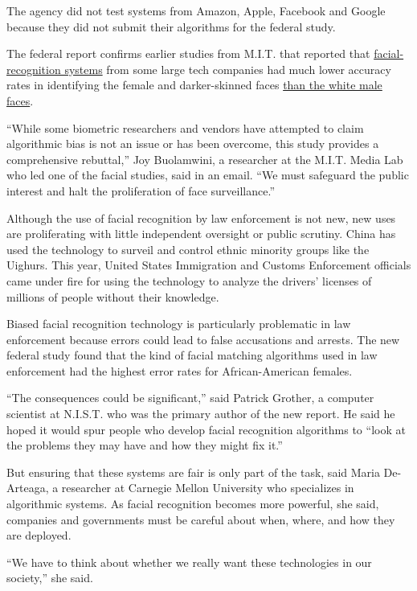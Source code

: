 The agency did not test systems from Amazon, Apple, Facebook and Google
because they did not submit their algorithms for the federal study.

The federal report confirms earlier studies from M.I.T. that reported
that
\href{https://www.nytimes.com/2019/05/15/business/facial-recognition-software-controversy.html}{facial-recognition
systems} from some large tech companies had much lower accuracy rates in
identifying the female and darker-skinned faces
\href{https://www.nytimes.com/2018/02/09/technology/facial-recognition-race-artificial-intelligence.html}{than
the white male faces}.

``While some biometric researchers and vendors have attempted to claim
algorithmic bias is not an issue or has been overcome, this study
provides a comprehensive rebuttal,'' Joy Buolamwini, a researcher at the
M.I.T. Media Lab who led one of the facial studies, said in an email.
``We must safeguard the public interest and halt the proliferation of
face surveillance.''

Although the use of facial recognition by law enforcement is not new,
new uses are proliferating with little independent oversight or public
scrutiny. China has used the technology to surveil and control ethnic
minority groups like the Uighurs. This year, United States Immigration
and Customs Enforcement officials came under fire for using the
technology to analyze the drivers' licenses of millions of people
without their knowledge.

Biased facial recognition technology is particularly problematic in law
enforcement because errors could lead to false accusations and arrests.
The new federal study found that the kind of facial matching algorithms
used in law enforcement had the highest error rates for African-American
females.

``The consequences could be significant,'' said Patrick Grother, a
computer scientist at N.I.S.T. who was the primary author of the new
report. He said he hoped it would spur people who develop facial
recognition algorithms to ``look at the problems they may have and how
they might fix it.''

But ensuring that these systems are fair is only part of the task, said
Maria De-Arteaga, a researcher at Carnegie Mellon University who
specializes in algorithmic systems. As facial recognition becomes more
powerful, she said, companies and governments must be careful about
when, where, and how they are deployed.

``We have to think about whether we really want these technologies in
our society,'' she said.

